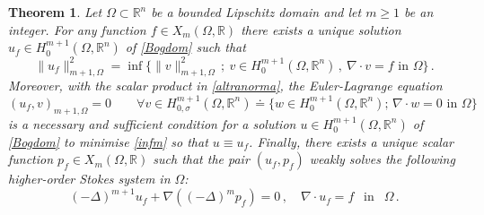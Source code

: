 \documentclass[11pt]{article}
\newtheorem{theorem}{Theorem}[section]
\theoremstyle{plain}
\theoremstyle{definition}
\numberwithin{equation}{section}
\newcommand{\R}{\mathbb{R}}
\begin{document}
\begin{theorem}\label{minBoghigh}
	Let $\Omega\subset\R^n$ be a bounded Lipschitz domain and let $m\ge1$ be an integer. For any function $f\in X_{m}(\Omega, \mathbb{R})$ there exists a unique solution
	$u_f\in H^{m+1}_0(\Omega, \mathbb{R}^{n})$ of \eqref{Bogdom} such that
	\begin{equation}\label{infm}
		\|u_f\|_{m+1,\Omega}^2=\inf\Big\{\|v\|_{m+1,\Omega}^2\, ;\ v\in H^{m+1}_0(\Omega, \mathbb{R}^{n})\, ,\ \nabla\cdot v=f\text{ in }\Omega\Big\}\, .
	\end{equation}
	Moreover, with the scalar product in \eqref{altranorma}, the Euler-Lagrange equation
	\begin{equation}\label{ELeqm}
		(u_f,v)_{m+1, \Omega}=0\qquad\forall v\in H^{m+1}_{0, \sigma}(\Omega, \mathbb{R}^{n})\doteq\{w\in H^{m+1}_0(\Omega, \mathbb{R}^{n});\, \nabla \cdot w=0\mbox{ in }\Omega\}\,
	\end{equation}
	is a necessary and sufficient condition for a solution $u\in H^{m+1}_0(\Omega, \mathbb{R}^{n})$ of \eqref{Bogdom} to minimise \eqref{infm} so that $u\equiv u_f$.
	Finally, there exists a unique scalar function $p_{f} \in X_{m}(\Omega, \mathbb{R})$ such that the pair $(u_{f},p_{f})$ weakly solves the following higher-order Stokes system in $\Omega$:
	\begin{equation} \label{gstokesm}
		(-\Delta)^{m+1} u_{f} + \nabla ((-\Delta)^{m} p_{f}) = 0 \, , \quad \nabla \cdot u_{f} = f \ \ \mbox{ in } \ \ \Omega \, .
	\end{equation}
\end{theorem}
\noindent
\end{document}
